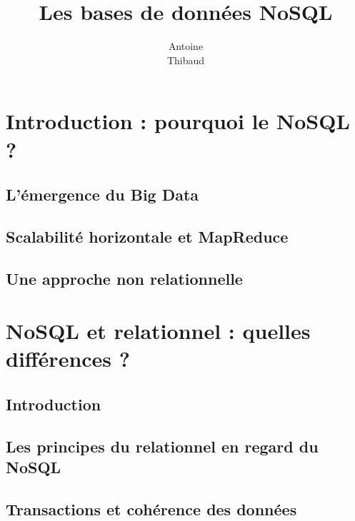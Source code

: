 \documentclass[12pt,titlepage,a4paper]{report}
\title{Les bases de données NoSQL}
\author{Antoine \bsc{Augusti}\\ Thibaud \bsc{Dauce}}
\begin{document}
	\dominitoc
	\tableofcontents

	\chapter*{Introduction : pourquoi le NoSQL ?}
	\minitoc

		\section*{L'émergence du Big Data}
			

		\section*{Scalabilité horizontale et MapReduce}
			

		\section*{Une approche non relationnelle}
			


	\chapter{NoSQL et relationnel : quelles différences ?}
	\minitoc

		\section*{Introduction}
			

		\section{Les principes du relationnel en regard du NoSQL}
      


		\section{Transactions et cohérence des données}
			
\end{document}
